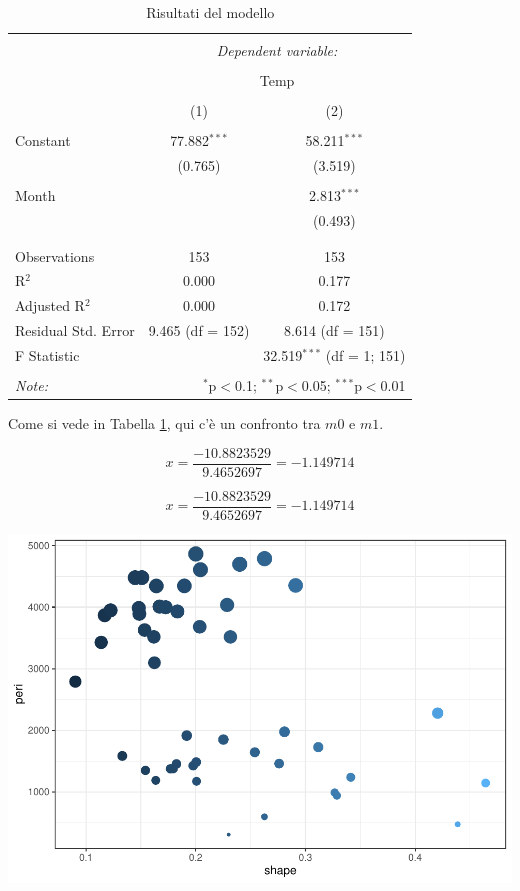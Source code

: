 \documentclass[
]{article}
\begin{document}
\begin{table}[H] \centering 
  \caption{Risultati del modello} 
  \label{tab:model.comparison} 
\begin{tabular}{@{\extracolsep{5pt}}lcc} 
\\[-1.8ex]\hline 
\hline \\[-1.8ex] 
 & \multicolumn{2}{c}{\textit{Dependent variable:}} \\ 
\cline{2-3} 
\\[-1.8ex] & \multicolumn{2}{c}{Temp} \\ 
\\[-1.8ex] & (1) & (2)\\ 
\hline \\[-1.8ex] 
 Constant & 77.882$^{***}$ & 58.211$^{***}$ \\ 
  & (0.765) & (3.519) \\ 
  & & \\ 
 Month &  & 2.813$^{***}$ \\ 
  &  & (0.493) \\ 
  & & \\ 
\hline \\[-1.8ex] 
Observations & 153 & 153 \\ 
R$^{2}$ & 0.000 & 0.177 \\ 
Adjusted R$^{2}$ & 0.000 & 0.172 \\ 
Residual Std. Error & 9.465 (df = 152) & 8.614 (df = 151) \\ 
F Statistic &  & 32.519$^{***}$ (df = 1; 151) \\ 
\hline 
\hline \\[-1.8ex] 
\textit{Note:}  & \multicolumn{2}{r}{$^{*}$p$<$0.1; $^{**}$p$<$0.05; $^{***}$p$<$0.01} \\ 
\end{tabular} 
\end{table}

Come si vede in Tabella \ref{tab:model.comparison}, qui c'è un confronto tra \(m0\) e \(m1\).

\[x = \frac{-10.8823529}{9.4652697} =-1.149714\]

\[x = \frac{-10.8823529}{9.4652697} =-1.149714\]

\begin{center}\includegraphics[width=0.5\linewidth]{Airquality2_files/figure-latex/plot-static-1} \end{center}
\end{document}
